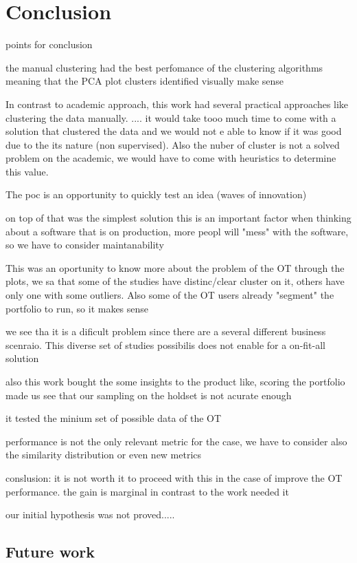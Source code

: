 \chapter{Conclusion} \label{cha:conclusion}


points for conclusion

the manual clustering had the best perfomance of the clustering algorithms
    meaning that the PCA plot clusters identified visually make sense
    
In contrast to academic approach, this work had several practical approaches like clustering the data manually. .... it would take tooo much time to come with a solution that clustered the data and we would not e able to know if it was good due to the its nature (non supervised). Also the nuber of cluster is not a solved problem on the academic, we would have to come with heuristics to determine this value.

The poc is an opportunity to quickly test an idea (waves of innovation)

on top of that was the simplest solution this is an important factor when thinking about a software that is on production, more peopl will "mess" with the software, so we have to consider maintanability

This was an oportunity to know more about the problem of the OT through the plots, we sa that some of the studies have distinc/clear cluster on it, others have only one with some outliers. Also some of the OT users already "segment" the portfolio to run, so it makes sense

we see tha it is a dificult problem since there are a several different business scenraio. This diverse set of studies possibilis does not enable for a on-fit-all solution

also this work bought the some insights to the product like, scoring the portfolio made us see that our sampling on the holdset is not acurate enough

it tested the minium set of possible data of the OT

performance is not the only relevant metric for the case, we have to consider also the similarity distribution or even new metrics

conslusion: it is not worth it to proceed with this in the case of improve the OT performance. the gain is marginal in contrast to the work needed it

our initial hypothesis was not proved.....

\section*{Future work}

